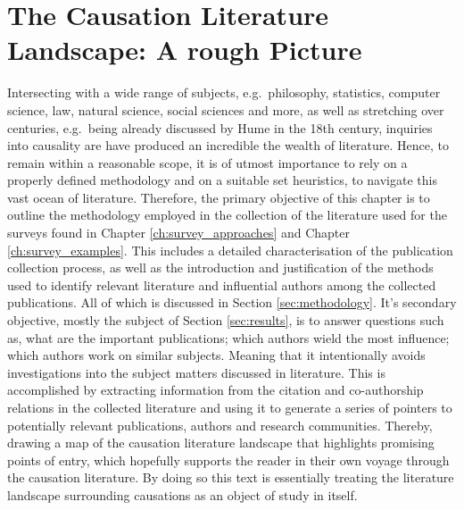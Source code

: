 \documentclass[11pt,a4paper]{book}
\theoremstyle{definition}
\theoremstyle{definition}
\theoremstyle{definition}
\theoremstyle{remark}
\begin{document}
\chapter{The Causation Literature Landscape: A rough Picture}

Intersecting with a wide range of subjects, e.g.\ philosophy, statistics, computer science, law, natural science, social sciences and more, as well as stretching over centuries, e.g.\ being already discussed by Hume in the 18th century, inquiries into causality are have produced an incredible the wealth of literature. Hence, to remain within a reasonable scope, it is of utmost importance to rely on a properly defined methodology and on a suitable set heuristics, to navigate this vast ocean of literature.
Therefore, the primary objective of this chapter is to outline the methodology employed in the collection of the literature used for the surveys found in Chapter \ref{ch:survey_approaches} and Chapter \ref{ch:survey_examples}. This includes a detailed characterisation of the publication collection process, as well as the introduction and justification of the methods used to identify relevant literature and influential authors among the collected publications.
All of which is discussed in Section \ref{sec:methodology}.
It's secondary objective, mostly the subject of Section \ref{sec:results}, is to answer questions such as, what are the important publications; which authors wield the most influence; which authors work on similar subjects. Meaning that it intentionally avoids investigations into the subject matters discussed in literature. This is accomplished by extracting information from the citation and co-authorship relations in the collected literature and using it to generate a series of pointers to potentially relevant publications, authors and research communities. Thereby, drawing a map of the causation literature landscape that highlights promising points of entry, which hopefully supports the reader in their own voyage through the causation literature.
%
%
%
By doing so this text is essentially treating the literature landscape surrounding causations as an object of study in itself. 
\end{document}
